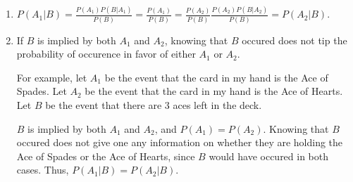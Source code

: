 \begin{enumerate}[label=(\alph*)]

\item $P(A_{1}|B) = \frac{P(A_{1})P(B|A_{1})}{P(B)} = \frac{P(A_{1})}{P(B)} = 
\frac{P(A_{2})}{P(B)} \frac{P(A_{2})P(B|A_{2})}{P(B)} = P(A_{2}|B)$.

\item If $B$ is implied by both $A_{1}$ and $A_{2}$, knowing that $B$ occured 
does not tip the probability of occurence in favor of either $A_{1}$ or $A_{2}$.

For example, let $A_{1}$ be the event that the card in my hand is the Ace of Spades. 
Let $A_{2}$ be the event that the card in my hand is the Ace of Hearts. 
Let $B$ be the event that there are $3$ aces left in the deck.

$B$ is implied by both $A_{1}$ and $A_{2}$, and $P(A_{1}) = P(A_{2})$. 
Knowing that $B$ occured does not give one any information on whether they are 
holding the Ace of Spades or the Ace of Hearts, since $B$ would have occured in 
both cases. Thus, $P(A_{1}|B) = P(A_{2}|B)$.
\end{enumerate}